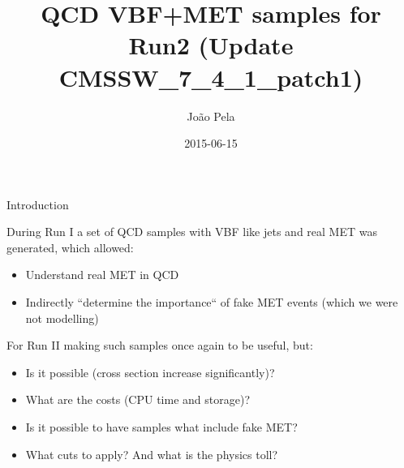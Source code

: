 \documentclass[8pt]{beamer}
\author[J. Pela]{João Pela}
\title{QCD VBF+MET samples for Run2 (Update CMSSW\_7\_4\_1\_patch1)}
\institute[ICL]{Imperial College London}
\date{2015-06-15}
\begin{document}
\setlength{\unitlength}{1mm}

\begin{frame}
  \titlepage
\end{frame}

\begin{frame}{Introduction}

During Run I a set of QCD samples with VBF like jets and real MET was generated, which allowed:

\begin{block}
  
\begin{itemize}
  \item Understand real MET in QCD
  \item Indirectly ``determine the importance`` of fake MET events (which we were not modelling)
\end{itemize}

\end{block}

For Run II making such samples once again to be useful, but:

\begin{block}

\begin{itemize}
  \item Is it possible (cross section increase significantly)?
  \item What are the costs (CPU time and storage)?
  \item Is it possible to have samples what include fake MET?
  \item What cuts to apply? And what is the physics toll?
\end{itemize}
  
\end{block}

\end{frame}
\end{document}
